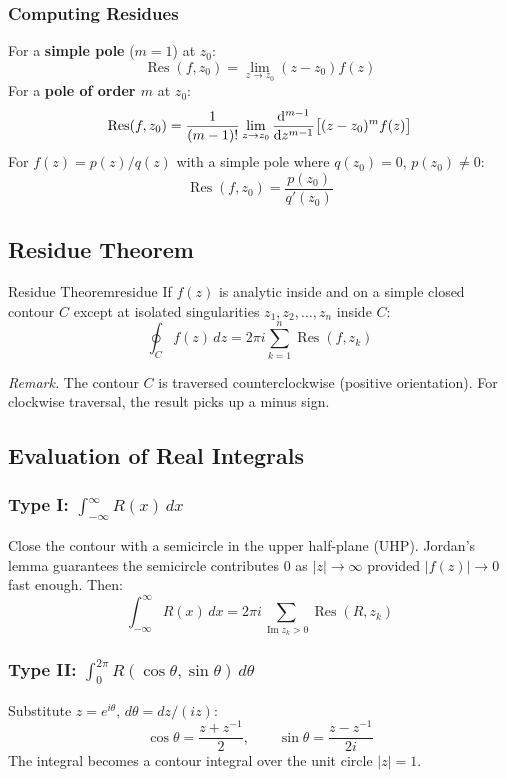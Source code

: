 \documentclass[11pt, letterpaper]{article}
\theoremstyle{plain}
\newenvironment{remark}{\smallskip\noindent\textit{Remark.}}{\smallskip}
\renewcommand{\Im}{\operatorname{Im}}
\renewcommand{\Res}{\operatorname{Res}}
\begin{document}
\subsubsection*{Computing Residues}

For a \textbf{simple pole} ($m=1$) at $z_0$:
\[
    \Res(f, z_0) = \lim_{z \to z_0}(z - z_0)f(z)
\]
For a \textbf{pole of order $m$} at $z_0$:
\[
    \Res(f, z_0) = \frac{1}{(m-1)!}\lim_{z\to z_0}
    \dv[m-1]{}{z}\bigl[(z-z_0)^m f(z)\bigr]
\]
For $f(z) = p(z)/q(z)$ with a simple pole where $q(z_0)=0$, $p(z_0)\neq 0$:
\[
    \Res(f, z_0) = \frac{p(z_0)}{q'(z_0)}
\]


\subsection{Residue Theorem}

\begin{theorem}{Residue Theorem}{residue}
    If $f(z)$ is analytic inside and on a simple closed contour $C$ except
    at isolated singularities $z_1, z_2, \ldots, z_n$ inside $C$:
    \[
        \oint_C f(z)\,dz = 2\pi i \sum_{k=1}^{n} \Res(f, z_k)
    \]
\end{theorem}

\begin{remark}
    The contour $C$ is traversed counterclockwise (positive orientation).
    For clockwise traversal, the result picks up a minus sign.
\end{remark}


\subsection{Evaluation of Real Integrals}

\subsubsection*{Type I: $\int_{-\infty}^{\infty} R(x)\,dx$}
Close the contour with a semicircle in the upper half-plane (UHP).
Jordan's lemma guarantees the semicircle contributes $0$ as $|z|\to\infty$
provided $|f(z)| \to 0$ fast enough. Then:
\[
    \int_{-\infty}^{\infty} R(x)\,dx = 2\pi i \sum_{\Im z_k > 0} \Res(R, z_k)
\]

\subsubsection*{Type II: $\int_0^{2\pi} R(\cos\theta, \sin\theta)\,d\theta$}
Substitute $z = e^{i\theta}$, $d\theta = dz/(iz)$:
\[
    \cos\theta = \frac{z + z^{-1}}{2}, \qquad
    \sin\theta = \frac{z - z^{-1}}{2i}
\]
The integral becomes a contour integral over the unit circle $|z|=1$.
\end{document}
